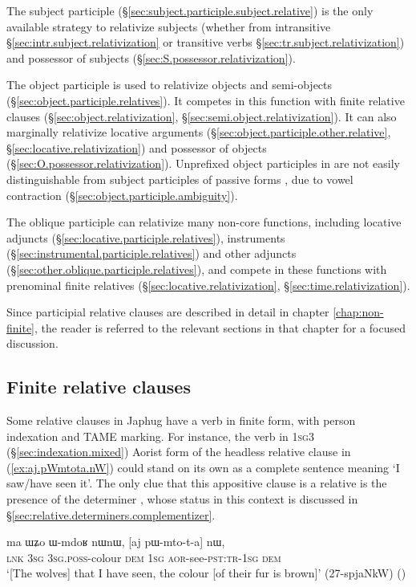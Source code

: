 The subject participle (§\ref{sec:subject.participle.subject.relative}) is the only available strategy to relativize subjects (whether from intransitive §\ref{sec:intr.subject.relativization} or transitive verbs §\ref{sec:tr.subject.relativization}) and possessor of subjects (§\ref{sec:S.possessor.relativization}).

The object participle is used to relativize objects and semi-objects (§\ref{sec:object.participle.relatives}). It competes in this function with finite relative clauses (§\ref {sec:object.relativization}, §\ref{sec:semi.object.relativization}). It can also marginally relativize locative arguments (§\ref{sec:object.participle.other.relative}, §\ref{sec:locative.relativization}) and possessor of objects (§\ref{sec:O.possessor.relativization}). Unprefixed object participles in  are not easily distinguishable from subject participles of passive forms , due to vowel contraction (§\ref{sec:object.participle.ambiguity}).
 
The oblique participle can relativize many non-core functions, including locative adjuncts (§\ref{sec:locative.participle.relatives}), instruments (§\ref{sec:instrumental.participle.relatives}) and other adjuncts (§\ref{sec:other.oblique.participle.relatives}), and compete in these functions with prenominal finite relatives (§\ref{sec:locative.relativization}, §\ref{sec:time.relativization}).
 
Since participial relative clauses are described in detail in chapter \ref{chap:non-finite}, the reader is referred to the relevant sections in that chapter for a focused discussion.
 
\subsection{Finite relative clauses} \label{sec:finite.relatives}
Some relative clauses in Japhug have a verb in finite form, with person indexation and TAME marking. For instance, the verb  in \textsc{1sg}\fl{}3 (§\ref{sec:indexation.mixed}) Aorist form of the headless relative clause in (\ref{ex:aj.pWmtota.nW}) could stand on its own as a complete sentence meaning `I saw/have seen it'. The only clue that this appositive clause is a relative is the presence of the determiner , whose status in this context is discussed in §\ref{sec:relative.determiners.complementizer}.

\begin{exe}
\ex \label{ex:aj.pWmtota.nW}
 \gll ma ɯʑo ɯ-mdoʁ nɯnɯ, [aj pɯ-mto-t-a] nɯ, \\
 \textsc{lnk} \textsc{3sg} \textsc{3sg}.\textsc{poss}-colour \textsc{dem} \textsc{1sg} \textsc{aor}-see-\textsc{pst}:\textsc{tr}-\textsc{1sg} \textsc{dem} \\
 \glt `[The wolves] that I have seen, the colour [of their fur is brown]' (27-spjaNkW)
()
\end{exe}

